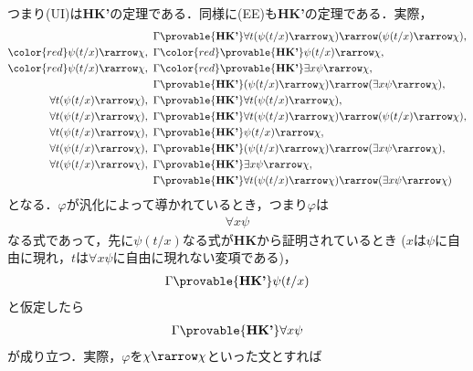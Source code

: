 \begin{metaprf}
\begin{description}
			つまり(UI)は{\bf HK'}の定理である．同様に(EE)も{\bf HK'}の定理である．実際，
			\begin{align}
				\Gamma &\provable{\mbox{{\bf HK'}}} 
					\forall t (\psi(t/x) \rarrow \chi) 
					\rarrow (\psi(t/x) \rarrow \chi), \\
				\color{red}\psi(t/x) \rarrow \chi,\ \Gamma &
				\color{red}\provable{\mbox{{\bf HK'}}}
					\psi(t/x) \rarrow \chi, \\
				\color{red}\psi(t/x) \rarrow \chi,\ \Gamma &
				\color{red}\provable{\mbox{{\bf HK'}}}
					\exists x \psi \rarrow \chi, \\
				\Gamma &\provable{\mbox{{\bf HK'}}} (\psi(t/x) \rarrow \chi) 
					\rarrow (\exists x \psi \rarrow \chi), \\
				\forall t (\psi(t/x) \rarrow \chi),\ \Gamma
					&\provable{\mbox{{\bf HK'}}} \forall t (\psi(t/x) \rarrow \chi), \\
				\forall t (\psi(t/x) \rarrow \chi),\ \Gamma
					&\provable{\mbox{{\bf HK'}}} \forall t (\psi(t/x) \rarrow \chi)
					\rarrow (\psi(t/x) \rarrow \chi), \\
				\forall t (\psi(t/x) \rarrow \chi),\ \Gamma
					&\provable{\mbox{{\bf HK'}}} \psi(t/x) \rarrow \chi, \\
				\forall t (\psi(t/x) \rarrow \chi),\ \Gamma
					&\provable{\mbox{{\bf HK'}}} (\psi(t/x) \rarrow \chi) 
					\rarrow (\exists x \psi \rarrow \chi), \\
				\forall t (\psi(t/x) \rarrow \chi),\ \Gamma
					&\provable{\mbox{{\bf HK'}}} \exists x \psi \rarrow \chi, \\
				\Gamma &\provable{\mbox{{\bf HK'}}} \forall t (\psi(t/x) \rarrow \chi) 
					\rarrow (\exists x \psi \rarrow \chi)
			\end{align}
			となる．$\varphi$が汎化によって導かれているとき，つまり$\varphi$は
			\begin{align}
				\forall x \psi
			\end{align}
			なる式であって，先に$\psi(t/x)$なる式が{\bf HK}から証明されているとき
			($x$は$\psi$に自由に現れ，$t$は$\forall x \psi$に自由に現れない変項である)，
			\begin{align}
				\Gamma \provable{\mbox{{\bf HK'}}} \psi(t/x)
			\end{align}
			と仮定したら
			\begin{align}
				\Gamma \provable{\mbox{{\bf HK'}}} \forall x \psi
			\end{align}
			が成り立つ．実際，$\varphi$を$\chi \rarrow \chi$といった文とすれば
			\begin{align}

\end{align}
\end{description}
\end{metaprf}
